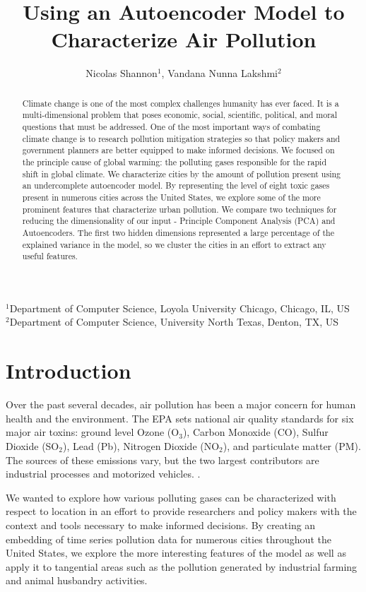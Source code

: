 \documentclass{article}
\title{Using an Autoencoder Model to Characterize Air Pollution}
\author{Nicolas Shannon$^{1}$, Vandana Nunna Lakshmi$^{2}$}
\date{}
\begin{document}
\setlength{\parindent}{3ex}
\setlength{\parskip}{0.25ex}

\begin{centering}
\maketitle
\vspace{-0.50cm}
\scriptsize
{$^{1}$Department of Computer Science, Loyola University Chicago, Chicago, IL, US}\\
{$^{2}$Department of Computer Science, University North Texas, Denton, TX, US}\\
\end{centering}

\begin{abstract}
Climate change is one of the most complex challenges humanity has ever faced. It is a
multi-dimensional problem that poses economic, social, scientific, political, and 
moral questions that must be addressed. One of the most important ways of 
combating climate change is to research pollution mitigation strategies 
so that policy makers and government planners are better equipped to  make 
informed decisions. We focused on the principle cause of global warming:
the polluting gases responsible for the rapid shift in global climate.
We characterize cities by the amount of pollution present using an undercomplete autoencoder
model. By representing the level of eight toxic gases present in numerous cities
across the United States, we explore some of the more prominent features 
that characterize urban pollution. We compare two techniques for reducing 
the dimensionality of our input - Principle Component Analysis (PCA) and
Autoencoders. The first two hidden dimensions represented
a large percentage of the explained variance in the model, so we cluster
the cities in an effort to extract any useful features. 
\end{abstract}
\vspace{0.25cm}
\section{Introduction}

\par Over the past several decades, air pollution has been a major concern for human health
and the environment. The EPA sets national air quality standards for  six major air
toxins: ground level Ozone (O$_3$), Carbon Monoxide (CO), Sulfur Dioxide (SO$_2$),
Lead (Pb), Nitrogen Dioxide (NO$_2$), and particulate matter (PM). The sources of these emissions vary, but the two largest contributors are industrial processes and motorized vehicles. \parencite{NAAQS09}.
\par We wanted to explore how various polluting gases can be characterized with respect to location in an effort to provide researchers and policy makers with the context and tools necessary to make informed decisions. By creating an embedding of time series pollution data for numerous cities throughout the United States, we explore the more interesting features of the model as well as apply it to tangential areas such as the pollution generated by industrial farming and animal husbandry activities.
\end{document}
